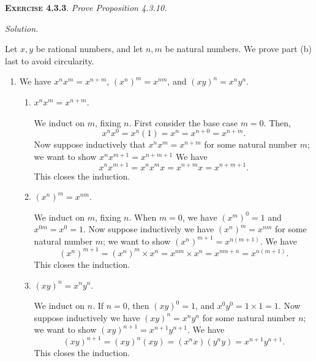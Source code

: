 \documentclass[12pt]{article}
\theoremstyle{remark}
\newenvironment{exer}[2]{
    \noindent \setlength{\parskip}{1em}%
    \textsc{\textbf{Exercise #1}}. \textit{#2} \par
    \noindent \textit{Solution.} %
}{\bigskip}
\begin{document}
\begin{exer}{4.3.3}{
    Prove Proposition 4.3.10.
}
    Let $x, y$ be rational numbers, and let $n, m$ be natural numbers.
    We prove part (b) last to avoid circularity.
    
    \begin{enumerate}[topsep=0mm,label=(\alph*)]
        \item[(a)] We have $x^n x^m = x^{n+m}$, $(x^n)^m = x^{nm}$, and $(xy)^n = x^n y^n$.
            \begin{enumerate}[topsep=0mm,label=(\roman*)]
                \item[(i)] $x^n x^m = x^{n+m}$.

                    We induct on $m$, fixing $n$.
                    First consider the base case $m = 0$.
                    Then,
                    \[
                        x^n x^0 = x^n (1) = x^n = x^{n + 0} = x^{n + m}.
                    \]
                    Now suppose inductively that $x^n x^m = x^{n+m}$ for some natural number $m$;
                    we want to show $x^n x^{m + 1} = x^{n+m+1}$
                    We have
                    \[
                        x^n x^{m + 1} = x^n x^m x = x^{n + m} x = x^{n + m + 1}.
                    \]
                    This closes the induction.
                
                \item[(ii)] $(x^n)^m = x^{nm}$.

                    We induct on $m$, fixing $n$.
                    When $m = 0$, we have $(x^m)^0 = 1$ and $x^{0m} = x^0 = 1$.
                    Now suppose inductively we have $(x^n)^m = x^{nm}$ for some natural number $m$; we want to show $(x^n)^{m+1} = x^{n(m + 1)}$.
                    We have
                    \[
                        (x^n)^{m+1} = (x^n)^m \times x^n = x^{nm} \times x^n = x^{nm + n} = x^{n(m+1)}.
                    \]
                    This closes the induction.
                
                \item[(iii)] $(xy)^n = x^n y^n$.

                    We induct on $n$.
                    If $n = 0$, then $(xy)^0 = 1$, and $x^0 y^0 = 1 \times 1 = 1$.
                    Now suppose inductively we have $(xy)^n = x^n y^n$ for some natural number $n$;
                    we want to show $(xy)^{n+1} = x^{n+1} y^{n+1}$.
                    We have
                    \[
                        (xy)^{n+1} = (xy)^n (xy) = (x^n x)(y^n y) = x^{n+1} y^{n+1}.
                    \]
                    This closes the induction.
            \end{enumerate}


\end{enumerate}
\end{exer}
\end{document}
